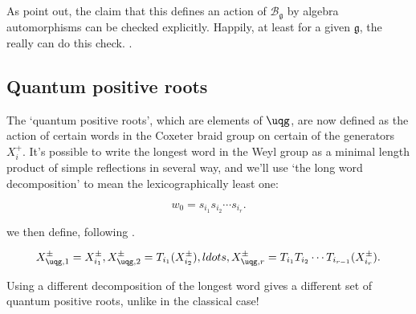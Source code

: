 As \cite{CP} point out, the claim that this defines an action of $\mathcal{B}_\mathfrak{g}$ by algebra automorphisms can be checked explicitly. Happily,
at least for a given $\mathfrak{g}$, the \pkg really can do this check. .

\subsection{Quantum positive roots}
The `quantum positive roots', which are elements of $\uqg$, are now defined as the action of certain words in the Coxeter braid group on certain of the
generators $X_i^+$. It's possible to write the longest word in the Weyl group as a minimal length product of simple reflections in several way, and
we'll use `the long word decomposition' to mean the lexicographically least one:

$$ w_0 = s_{i_1} s_{i_2} \cdots s_{i_r}.$$

we then define, following \cite{CP}.

$$X_{\uqg, 1}^\pm = X_{i_1}^\pm, X_{\uqg, 2}^\pm = T_{i_1}(X_{i_2}^\pm), ldots, X_{\uqg, r}^\pm = T_{i_1}T_{i_2}\cdots T_{i_{r-1}}(X_{i_r}^\pm).$$

Using a different decomposition of the longest word gives a different set of quantum positive roots, unlike in the classical case! \cite[\S8.1B]{CP}

